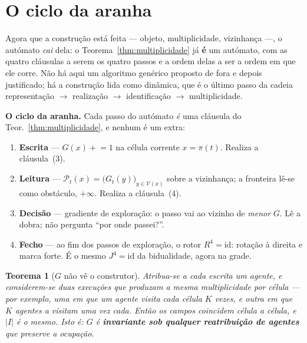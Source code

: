 \documentclass[11pt,a4paper]{article}
\newcommand{\abs}[1]{\lvert #1\rvert}
\newtheorem{teorema}{Teorema}
\begin{document}
\section{O ciclo da aranha}\label{sec:algoritmo}

\noindent Agora que a construção está feita --- objeto, multiplicidade,
vizinhança ---, o autómato \emph{cai} dela: o Teorema~\ref{thm:multiplicidade}
já \textbf{é} um autómato, com as quatro cláusulas a serem os quatro passos e a
ordem delas a ser a ordem em que ele corre. Não há aqui um algoritmo genérico
proposto de fora e depois justificado; há a construção lida como dinâmica, que
é o último passo da cadeia
representação $\to$ realização $\to$ identificação $\to$ multiplicidade.

\medskip\noindent\textbf{O ciclo da aranha.} Cada passo do autómato \emph{é}
uma cláusula do Teor.~\ref{thm:multiplicidade}, e nenhum é um extra:

\begin{enumerate}\itemsep3pt
\item[1.] \textbf{Escrita} --- $G(x)\mathrel{+}=1$ na célula corrente $x=\pi(t)$.
      Realiza a cláusula~(3).
\item[2.] \textbf{Leitura} --- $\mathcal{P}_{t}(x)=\bigl(G_t(y)\bigr)_{y\in \mathcal{V}(x)}$
      sobre a vizinhança; a fronteira lê-se como obstáculo, $+\infty$. Realiza a
      cláusula~(4).
\item[3.] \textbf{Decisão} --- gradiente de exploração: o passo vai ao vizinho de
      \emph{menor} $G$. Lê a dobra; não pergunta ``por onde passei?''.
\item[4.] \textbf{Fecho} --- ao fim dos passos de exploração, o rotor
      $R^{4}=\mathrm{id}$: rotação à direita e marca forte. É o mesmo
      $J^{4}=\mathrm{id}$ da bidualidade, agora na grade.
\end{enumerate}

\begin{teorema}[$G$ não vê o construtor]\label{thm:agentes}
Atribua-se a cada escrita um \emph{agente}, e considerem-se duas execuções que
produzam a mesma multiplicidade por célula --- por exemplo, uma em que \emph{um}
agente visita cada célula $K$ vezes, e outra em que $K$ agentes a visitam uma vez
cada. Então os campos coincidem célula a célula, e $\abs{I}$ é o mesmo. Isto é:
$G$ é \textbf{invariante sob qualquer reatribuição de agentes} que preserve a
ocupação.
\end{teorema}
\end{document}
